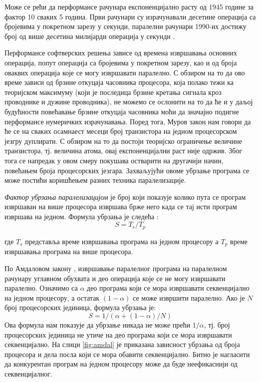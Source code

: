 \documentclass[12pt,oneside]{memoir}
\begin{document}
   Може се рећи да перформансе рачунара експоненцијално расту од 1945 године за фактор 10 сваких 5 година. Први рачунари су израчунавали десетине операција са бројевима у покретном зарезу у секунди, паралелни рачунари 1990-их достижу број од више десетина милијарди операција у секунди \cite{par_history}.
   
    Перформансе софтверских решења зависе од времена извршавања основних операција, попут операција са бројевима у покретном зарезу, као и од броја оваквих операција које се могу извршавати паралелно. С обзиром на то да ово време зависи од брзине откуцаја часовника процесора, која полако тежи ка теоријском максимуму (који је последица брзине кретања сигнала кроз проводнике и дужине проводника), не можемо се ослонити на то да ће и у даљој будућности повећавање брзине откуцаја часовника моћи да значајно подигне перформансе нумеричких израчунавања.
    Поред тога, Муров закон \cite{moore} нам говори да ће се на сваких осамнаест месеци број транзистора на једном процесорском језгру дуплирати. С обзиром на то да постоји теоријско ограничење величине транзистора, тј. величина атома, овај експоненцијални раст није одржив. Због тога се напредак у овом смеру покушава остварити на другачији начин, повећањем броја процесорских језгара. Захваљујући овоме убрзање програма  се може постићи коришћењем разних техника паралелизације.
    
     \textit{Фактор убрзања паралелизацијом} је број који показује колико пута се програм извршаван на више процесора извршава брже него када се тај исти програм извршава на једном. Формула убрзања је следећа \cite{par_various}:
 	$$ S = T_s/T_p $$
 	
\noindent где $ T_s $ представља време извршавања програма на једном процесору а $ T_p $ време извршавања програма на више процесора. 

 По Амдаловом закону \cite{par_various}, извршавање паралелног програма на паралелном рачунару углавном обухвата и део операција које се не могу извршавати паралелно. Означимо са $ \alpha $ део програма који се мора извршавати секвенцијално на једном процесору, а остатак $ (1 - \alpha)$ се може извршити паралелно. Ако је $ N $ број процесорских јединица, формула убрзања је: 
 	$$ S = 1 / ( \alpha + (1-\alpha)/N)$$
Ова формула нам показује да убрзање никада не може прећи $ 1/\alpha $, тј. број процесорских јединица не утиче на део програма који се мора извршавати секвенцијално. На слици \ref{fig:amdal} је приказана зависност убрзања од броја процесора и дела посла који се мора обавити секвенцијално. Битно је нагласити да конкурентан програм на једном процесору може да буде неефикаснији од секвенцијалног.
\end{document}
